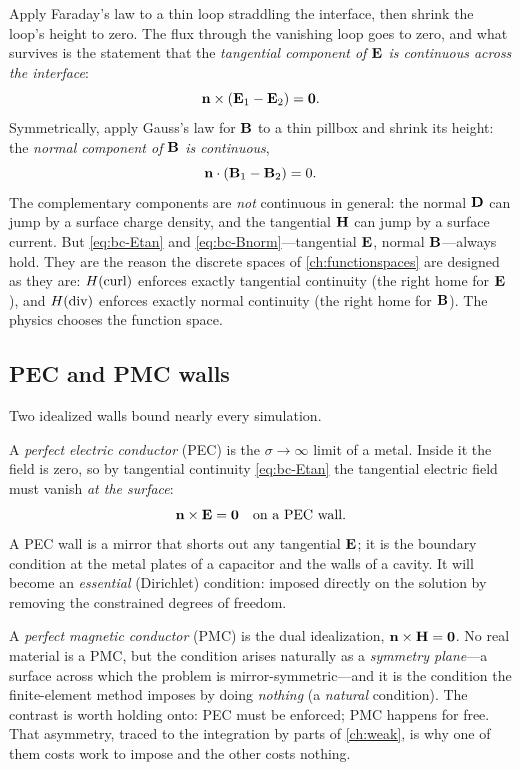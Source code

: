 Apply Faraday's law to a thin loop straddling the interface, then shrink the
loop's height to zero. The flux through the vanishing loop goes to zero, and
what survives is the statement that the \emph{tangential component of $\mathbf{E}$ is
continuous across the interface}:
\begin{equation}
  \mathbf{n}\times(\mathbf{E}_1-\mathbf{E}_2) = \bm 0. \label{eq:bc-Etan}
\end{equation}
Symmetrically, apply Gauss's law for $\mathbf{B}$ to a thin pillbox and shrink its
height: the \emph{normal component of $\mathbf{B}$ is continuous},
\begin{equation}
  \mathbf{n}\cdot(\mathbf{B}_1-\mathbf{B}_2) = 0. \label{eq:bc-Bnorm}
\end{equation}
The complementary components are \emph{not} continuous in general: the normal
$\mathbf{D}$ can jump by a surface charge density, and the tangential $\mathbf{H}$ can jump by
a surface current. But \eqref{eq:bc-Etan} and \eqref{eq:bc-Bnorm}---tangential
$\mathbf{E}$, normal $\mathbf{B}$---always hold. They are the reason the discrete spaces of
\cref{ch:functionspaces} are designed as they are: $H(\mathrm{curl})$ enforces exactly
tangential continuity (the right home for $\mathbf{E}$), and $H(\mathrm{div})$ enforces exactly
normal continuity (the right home for $\mathbf{B}$). The physics chooses the function
space.

\subsection{PEC and PMC walls}

Two idealized walls bound nearly every simulation.

A \emph{perfect electric conductor} (PEC) is the $\sigma\to\infty$ limit of a
metal. Inside it the field is zero, so by tangential continuity
\eqref{eq:bc-Etan} the tangential electric field must vanish \emph{at the
surface}:
\begin{equation}
  \mathbf{n}\times\mathbf{E} = \bm 0 \quad\text{on a PEC wall.} \label{eq:pec}
\end{equation}
A PEC wall is a mirror that shorts out any tangential $\mathbf{E}$; it is the
boundary condition at the metal plates of a capacitor and the walls of a
cavity. It will become an \emph{essential} (Dirichlet) condition: imposed
directly on the solution by removing the constrained degrees of freedom.

A \emph{perfect magnetic conductor} (PMC) is the dual idealization,
$\mathbf{n}\times\mathbf{H}=\bm0$. No real material is a PMC, but the condition arises
naturally as a \emph{symmetry plane}---a surface across which the problem is
mirror-symmetric---and it is the condition the finite-element method imposes by
doing \emph{nothing} (a \emph{natural} condition). The contrast is worth
holding onto: PEC must be enforced; PMC happens for free. That asymmetry,
traced to the integration by parts of \cref{ch:weak}, is why one of them costs
work to impose and the other costs nothing.

